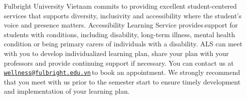 \documentclass[
]{article}
\begin{document}
Fulbright University Vietnam commits to providing excellent student-centered services that supports diversity, inclusivity and accessibility where the student's voice and presence matters. Accessibility Learning Service provides\,support for students with conditions, including disability, long-term illness, mental health condition or being primary carers of individuals with a disability. ALS can meet with you to develop individualized learning plan, share your plan with your professors and provide continuing support if necessary. You can contact us at\,\href{mailto:wellness@fulbright.edu.vn}{\nolinkurl{wellness@fulbright.edu.vn}}\,to book an appointment. We strongly recommend that you meet with us prior to the semester start to ensure timely development and implementation of your learning plan.
\end{document}

